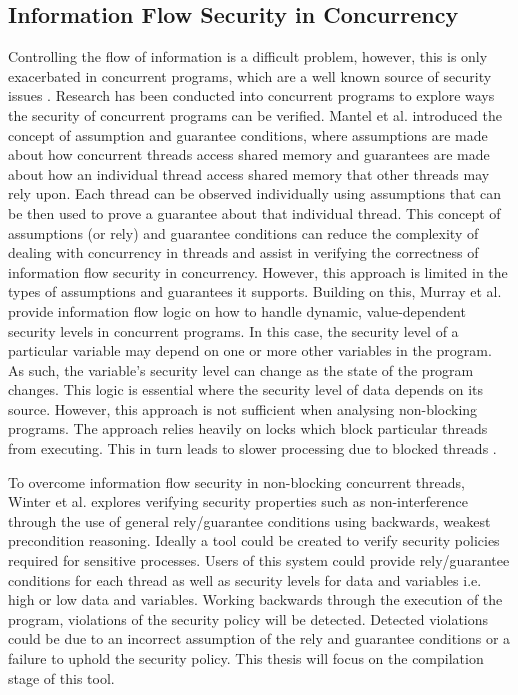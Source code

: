 \documentclass[twocolumn]{article}
\begin{document}
\subsection{Information Flow Security in Concurrency}
Controlling the flow of information is a difficult problem, however, this is only exacerbated in concurrent programs, which are a well known source of security issues \cite{mantel2014noninterference}\cite{smith2019value}\cite{vaughan2012secure}. Research has been conducted into concurrent programs to explore ways the security of concurrent programs can be verified. Mantel et al. \cite{mantel2011assumptions} introduced the concept of assumption and guarantee conditions, where assumptions are made about how concurrent threads access shared memory and guarantees are made about how an individual thread access shared memory that other threads may rely upon. Each thread can be observed individually using assumptions that can be then used to prove a guarantee about that individual thread. This concept of assumptions (or rely) and guarantee conditions can reduce the complexity of dealing with concurrency in threads and assist in verifying the correctness of information flow security in concurrency. However, this approach is limited in the types of assumptions and guarantees it supports. Building on this, Murray et al. \cite{ernst2019seccsl} \cite{murray2018covern} provide information flow logic on how to handle dynamic, value-dependent security levels in concurrent programs. In this case, the security level of a particular variable may depend on one or more other variables in the program. As such, the variable's security level can change as the state of the program changes. This logic is essential where the security level of data depends on its source. However, this approach is not sufficient when analysing non-blocking programs. The approach relies heavily on locks which block particular threads from executing. This in turn leads to slower processing due to blocked threads \cite{prakash1991non}.

To overcome information flow security in non-blocking concurrent threads, Winter et al. \cite{winter2020information} explores verifying security properties such as non-interference through the use of general rely/guarantee conditions using backwards, weakest precondition reasoning. Ideally a tool could be created to verify security policies required for sensitive processes. Users of this system could provide rely/guarantee conditions for each thread as well as security levels for data and variables i.e. high or low data and variables. Working backwards through the execution of the program, violations of the security policy will be detected. Detected violations could be due to an incorrect assumption of the rely and guarantee conditions or a failure to uphold the security policy. This thesis will focus on the compilation stage of this tool.
\end{document}

